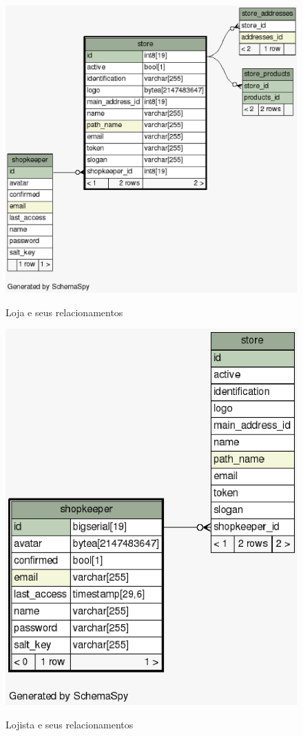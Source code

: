 \documentclass[a4paper,12pt]{monografia}
\begin{document}
\begin{figure}[H]
\centering
\caption{Loja e seus relacionamentos}
\centering
\includegraphics[scale=0.7]{img/diagramas/schema/store.1degree.png.eps}\\
\end{figure}

\begin{figure}[H]
\centering
\caption{Lojista e seus relacionamentos}
\centering
\includegraphics[scale=0.7]{img/diagramas/schema/shopkeeper.1degree.png.eps}\\
\end{figure}
\end{document}
